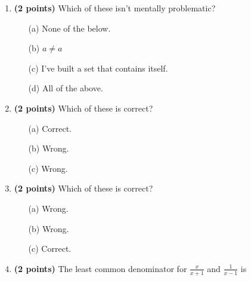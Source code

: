\documentclass[12pt]{amsart}
\begin{document}
\newpage
\begin{enumerate}
\item {\bf (2 points)} 
 Which of these isn't mentally problematic?

\begin{minipage}[t]{1.0\linewidth}\begin{itemize}\item[(a)]  None of the below.  \item[(b)]  $a \neq a$ \item[(c)]  I've built a set that contains itself. \item[(d)]   All of the above. \end{itemize}\end{minipage} \vfill 
\item {\bf (2 points)} 
 Which of these is correct?

\begin{minipage}[t]{1.0\linewidth}\begin{multicols}{3}\begin{itemize}\item[(a)]  Correct. \item[(b)]  Wrong. \item[(c)]  Wrong. \end{itemize}\end{multicols}\end{minipage} \vfill 
\item {\bf (2 points)} 
 Which of these is correct?

\begin{minipage}[t]{1.0\linewidth}\begin{multicols}{3}\begin{itemize}\item[(a)]  Wrong. \item[(b)]  Wrong. \item[(c)]  Correct. \end{itemize}\end{multicols}\end{minipage} \vfill 
\item {\bf (2 points)} 
 The least common denominator for $\displaystyle \frac{x}{x+1}$ and $\displaystyle \frac{1}{x-1}$ is \vspace{.2cm}


\end{enumerate}
\end{document}
